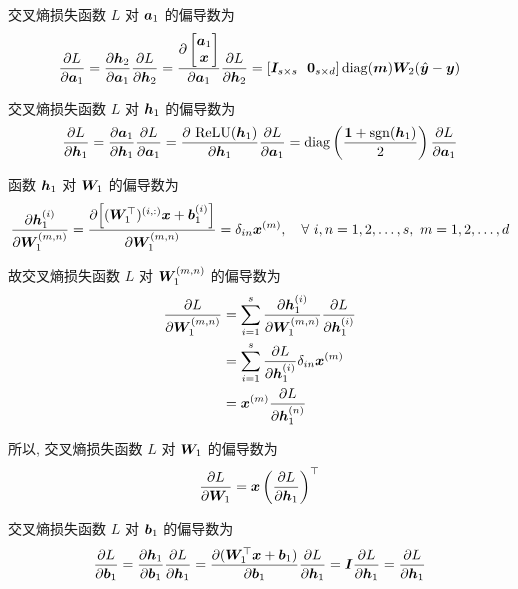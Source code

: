\documentclass{article}
\begin{document}
交叉熵损失函数 $L$ 对 $\bm{a}_1$ 的偏导数为
\begin{equation}
  \frac{\partial L}{\partial \bm{a}_1}=\frac{\partial\bm{h}_2}{\partial\bm{a}_1}\frac{\partial L}{\partial \bm{h}_2}
  =\frac{\partial
  \begin{bmatrix}
    \bm{a}_1\\\bm{x}\\
  \end{bmatrix}}{\partial\bm{a}_1}\frac{\partial L}{\partial \bm{h}_2}
  =[\bm{I}_{s\times s}~~\bm{0}_{s\times d}]
\operatorname{diag}(\bm{m})\bm{W}_2(\hat{\bm{y}}-\bm{y})
\end{equation}

交叉熵损失函数 $L$ 对 $\bm{h}_1$ 的偏导数为
\begin{equation}
  \frac{\partial L}{\partial \bm{h}_1}=\frac{\partial\bm{a}_1}{\partial\bm{h}_1}\frac{\partial L}{\partial \bm{a}_1}
  =\frac{\partial~\mathrm{ReLU}(\bm{h}_1)}{\partial\bm{h}_1}\frac{\partial L}{\partial \bm{a}_1}
  =\operatorname{diag}\left(\frac{\bm{1}+\operatorname{sgn}(\bm{h}_1)}{2}\right)\frac{\partial L}{\partial \bm{a}_1}
\end{equation}

函数 $\bm{h}_1$ 对 $\bm{W}_1$ 的偏导数为
\begin{equation}
  \frac{\partial \bm{h}_1^{(i)}}{\partial \bm{W}_1^{(m,n)}}=\frac{\partial \Big[(\bm{W}_1^\top)^{(i,:)}\bm{x}+\bm{b}_1^{(i)}\Big]}{\partial \bm{W}_1^{(m,n)}}=\delta_{in}\bm{x}^{(m)},\quad\forall~i,n=1,2,\dots,s,~m=1,2,\dots,d
\end{equation}

故交叉熵损失函数 $L$ 对 $\bm{W}_1^{(m,n)}$ 的偏导数为
\begin{equation}
  \begin{aligned}
    \frac{\partial L}{\partial \bm{W}_1^{(m,n)}}
    &=\sum_{i=1}^s\frac{\partial \bm{h}_1^{(i)}}{\partial\bm{W}_1^{(m,n)}}\frac{\partial L}{\partial \bm{h}_1^{(i)}}\\
    &=\sum_{i=1}^s\frac{\partial L}{\partial \bm{h}_1^{(i)}}\delta_{in}\bm{x}^{(m)}\\
    &=\bm{x}^{(m)}\frac{\partial L}{\partial \bm{h}_1^{(n)}}
  \end{aligned}
\end{equation}

所以, 交叉熵损失函数 $L$ 对 $\bm{W}_1$ 的偏导数为
\begin{equation}
  \frac{\partial L}{\partial \bm{W}_1}=\bm{x}\left(\frac{\partial L}{\partial \bm{h}_1}\right)^\top
\end{equation}

交叉熵损失函数 $L$ 对 $\bm{b}_1$ 的偏导数为
\begin{equation}
  \frac{\partial L}{\partial \bm{b}_1}=\frac{\partial\bm{h}_1}{\partial\bm{b}_1}\frac{\partial L}{\partial \bm{h}_1}=\frac{\partial(\bm{W}_1^\top\bm{x}+\bm{b}_1)}{\partial\bm{b}_1}\frac{\partial L}{\partial \bm{h}_1}=\bm{I}\frac{\partial L}{\partial \bm{h}_1}=\frac{\partial L}{\partial \bm{h}_1}
\end{equation}
\end{document}
